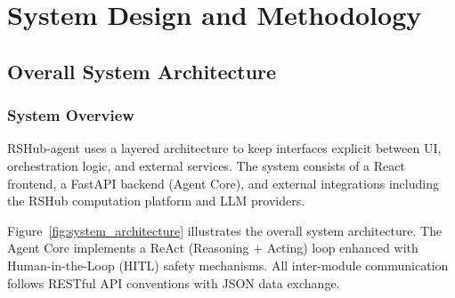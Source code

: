 
\chapter{System Design and Methodology}
\label{chap:system_design}

\section{Overall System Architecture}
\label{sec:architecture}

\subsection{System Overview}

RSHub-agent uses a layered architecture to keep interfaces explicit between UI, orchestration logic, and external services. The system consists of a React frontend, a FastAPI backend (Agent Core), and external integrations including the RSHub computation platform and LLM providers.

Figure~\ref{fig:system_architecture} illustrates the overall system architecture. The Agent Core implements a ReAct (Reasoning + Acting) loop enhanced with Human-in-the-Loop (HITL) safety mechanisms. All inter-module communication follows RESTful API conventions with JSON data exchange.

